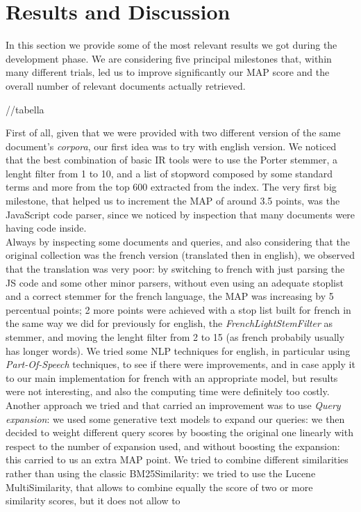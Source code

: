 \section{Results and Discussion}
\label{sec:results}

In this section we provide some of the most relevant results we got during the development phase.
We are considering five principal milestones that, within many different trials, led us to improve significantly our MAP score and the overall number of relevant documents actually retrieved.

//tabella

First of all, given that we were provided with two different version of the same document's \textit{corpora}, our first idea was to try with english version. 
We noticed that the best combination of basic IR tools were to use the Porter stemmer, a lenght filter from 1 to 10, and a list of stopword composed by some standard terms and more from the top 600 extracted from the index.
The very first big milestone, that helped us to increment the MAP of around 3.5 points, was the JavaScript code parser, since we noticed by inspection that many documents were having code inside.\\
Always by inspecting some documents and queries, and also considering that the original collection was the french version (translated then in english), we observed that the translation was very poor: by switching to french
with just parsing the JS code and some other minor parsers, without even using an adequate stoplist and a correct stemmer for the french language, the MAP was increasing by 5 percentual points; 2 more points were achieved with
a stop list built for french in the same way we did for previously for english, the \textit{FrenchLightStemFilter} as stemmer, and moving the lenght filter from 2 to 15 (as french probabily usually has longer words).
We tried some NLP techniques for english, in particular using \textit{Part-Of-Speech} techniques, to see if there were improvements, and in case apply it to our main implementation for french with an appropriate model, but results 
were not interesting, and also the computing time were definitely too costly.
Another approach we tried and that carried an improvement was to use \textit{Query expansion}: we used some generative text models to expand our queries: we then decided to weight different query scores by boosting the original one linearly with respect to the number
of expansion used, and without boosting the expansion: this carried to us an extra MAP point.
We tried to combine different similarities rather than using the classic BM25Similarity: we tried to use the Lucene MultiSimilarity, that allows to combine equally the score of two or more similarity scores, but it does not allow to
